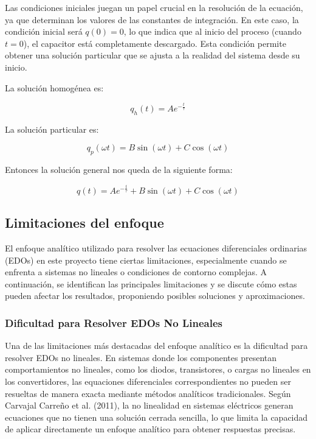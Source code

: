 Las condiciones iniciales juegan un papel crucial en la resolución de la ecuación, ya que
determinan los valores de las constantes de integración. En este caso, la condición inicial será
\(q(0) = 0\), lo que indica que al inicio del proceso (cuando \(t = 0\)), el capacitor está
completamente descargado. Esta condición permite obtener una solución particular que se
ajusta a la realidad del sistema desde su inicio.

La solución homogénea es:

\[
	q_h(t) = A e^{-\frac{t}{\tau}}
\]

La solución particular es:

\[
	q_p(\omega t) = B \sin(\omega t) + C \cos(\omega t)
\]

%
%
%

Entonces la solución general nos queda de la siguiente forma:

\[
	q(t) = A e^{-\frac{t}{\tau}} + B \sin(\omega t) + C \cos(\omega t)
\]

\subsection{Limitaciones del enfoque}
El enfoque analítico utilizado para resolver las ecuaciones diferenciales ordinarias (EDOs) en este
proyecto tiene ciertas limitaciones, especialmente cuando se enfrenta a sistemas no lineales o
condiciones de contorno complejas. A continuación, se identifican las principales limitaciones y se
discute cómo estas pueden afectar los resultados, proponiendo posibles soluciones y aproximaciones.

\subsubsection*{Dificultad para Resolver EDOs No Lineales}
Una de las limitaciones más destacadas del enfoque analítico es la dificultad para resolver
EDOs no lineales. En sistemas donde los componentes presentan comportamientos no
lineales, como los diodos, transistores, o cargas no lineales en los convertidores, las
equaciones diferenciales correspondientes no pueden ser resueltas de manera exacta mediante
métodos analíticos tradicionales. Según Carvajal Carreño et al. (2011), la no linealidad en
sistemas eléctricos generan ecuaciones que no tienen una solución cerrada sencilla, lo que
limita la capacidad de aplicar directamente un enfoque analítico para obtener respuestas
precisas.

